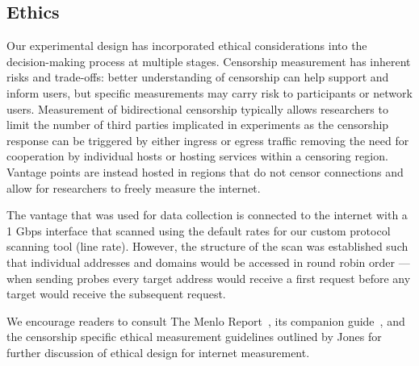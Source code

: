 \subsection{Ethics}\label{sec:methodology:ethics}

Our experimental design has incorporated ethical considerations into the
decision-making process at multiple stages. Censorship measurement has inherent
risks and trade-offs: better understanding of censorship can help support and
inform users, but specific measurements may carry risk to participants or
network users. Measurement of bidirectional censorship typically allows
researchers to limit the number of third parties implicated in experiments as
the censorship response can be triggered by either ingress or egress traffic
removing the need for cooperation by individual hosts or hosting services within
a censoring region. Vantage points are instead hosted in regions that do not
censor connections and allow for researchers to freely measure the internet.

The vantage that was used for data collection is connected to the internet with
a 1 Gbps interface that scanned using the default rates for our custom protocol
scanning tool (line rate). However, the structure of the scan was established
such that individual addresses and domains would be accessed in round robin
order --- \ie when sending probes every target address would receive a first
request before any target would receive the subsequent request.

We encourage readers to consult The Menlo Report~\cite{menlo}, its companion
guide~\cite{menlo-companion}, and the censorship specific ethical measurement
guidelines outlined by Jones \etal \cite{jones2015ethical} for further
discussion of ethical design for internet measurement.
